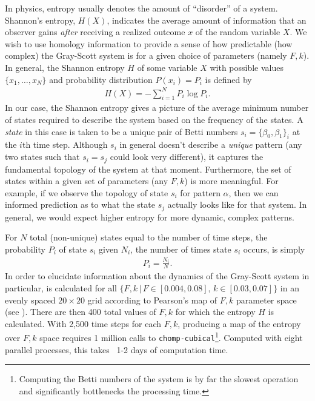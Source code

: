In physics, entropy usually denotes the amount of ``disorder'' of a system. Shannon's entropy, $H(X)$, indicates the average amount of information that an observer gains \emph{after} receiving a realized outcome $x$ of the random variable $X$. We wish to use homology information to provide a sense of how predictable (how complex) the Gray-Scott system is for a given choice of parameters (namely $F, k$). In general, the Shannon entropy $H$ of some variable $X$ with possible values $\{ x_1, \ldots, x_N \}$ and probability distribution $P(x_i) = P_i$ is defined by
\begin{align} \label{eq:shannon}
	H(X) = - \sum_{i=1}^{N} P_i \log{ P_i}.
\end{align}
In our case, the Shannon entropy gives a picture of the average minimum number of states required to describe the system based on the frequency of the states. A \emph{state} in this case is taken to be a unique pair of Betti numbers $s_i = \{ \beta_0, \beta_1 \}_i$ at the $i$th time step. Although $s_i$ in general doesn't describe a \emph{unique} pattern (any two states such that $s_i = s_j$ could look very different), it captures the fundamental topology of the system at that moment. Furthermore, the set of states within a given set of parameters (any $F, k$) is more meaningful. For example, if we observe the topology of state $s_i$ for pattern $\alpha$, then we can informed prediction as to what the state $s_j$ actually looks like for that system. In general, we would expect higher entropy for more dynamic, complex patterns.

For $N$ total (non-unique) states equal to the number of time steps, the probability $P_i$ of state $s_i$ given $N_i$, the number of times state $s_i$ occurs, is simply
\begin{align} \label{eq:Pi}
	P_i = \frac{N_i}{N}.
\end{align}
In order to elucidate information about the dynamics of the Gray-Scott system in particular,  is calculated for all $\{ F, k \, | \, F \in [0.004, 0.08], \, k \in [0.03, 0.07] \}$ in an evenly spaced $20 \times 20$ grid according to Pearson's map of $F, k$ parameter space (see ). There are then 400 total values of $F,k$ for which the entropy $H$ is calculated. With 2,500 time steps for each $F,k$, producing a map of the entropy over $F,k$ space requires 1 million calls to \texttt{chomp-cubical}\footnote{Computing the Betti numbers of the system is by far the slowest operation and significantly bottlenecks the processing time.}. Computed with eight parallel processes, this takes ~1-2 days of computation time.


